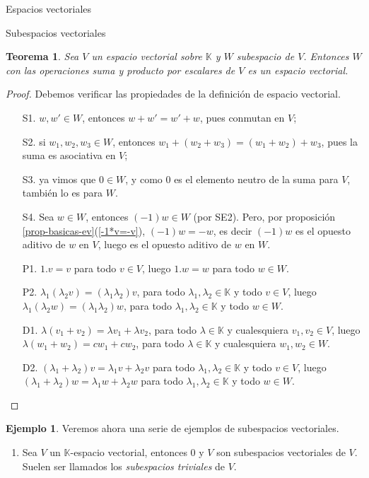 \documentclass[a4paper,12pt,twoside,spanish]{amsbook}
\newtheorem{teorema}{Teorema}[section]
\theoremstyle{definition}
\newtheorem{ejemplo}{Ejemplo}[section]
\theoremstyle{remark}
\newcommand{\K}{\mathbb K}
\begin{document}
\begin{chapter}{Espacios vectoriales}
\begin{section}{Subespacios vectoriales}
	\begin{teorema}
		Sea $V$ un espacio vectorial sobre $\K$ y $W$ subespacio de $V$. Entonces $W$ con las operaciones suma y producto por escalares de $V$ es un espacio vectorial.
	\end{teorema}
	\begin{proof} Debemos verificar las propiedades de la definición de espacio vectorial.
		\begin{enumerate}
			\item[S1.] $w,w' \in W$, entonces $w + w' = w' + w$, pues conmutan en $V$;
			\item[S2.] si $w_1,w_2,w_3 \in W$, entonces $w_1+(w_2+w_3) = (w_1+w_2)+w_3$, pues la suma es asociativa en $V$;
			\item[S3.] ya vimos que $0 \in W$, y como $0$ es el elemento neutro de la suma para $V$, también lo es para $W$.
			\item[S4.] Sea $w \in W$, entonces $(-1)w \in W$ (por SE2). Pero, por proposición \ref{prop-basicas-ev}(\ref{-1*v=-v}), $(-1)w=-w$,  es decir $(-1)w$ es el opuesto aditivo de $w$  en $V$, luego es el opuesto aditivo de $w$ en $W$.
			\item[P1.] $1.v=v$ para todo $v \in V$, luego $1.w =w$ para todo $w \in W$.
			\item[P2.] $\lambda_1(\lambda_2v) = (\lambda_1\lambda_2)v$, para todo $\lambda_1,\lambda_2 \in \K$ y todo $v \in V$, luego $\lambda_1(\lambda_2w) = (\lambda_1\lambda_2)w$, para todo $\lambda_1,\lambda_2 \in \K$ y todo $w \in W$.
			\item[D1.] $\lambda(v_1+v_2) = \lambda v_1 +\lambda v_2$, para todo $\lambda \in \K$ y cualesquiera $v_1,v_2 \in V$, luego   $\lambda(w_1+w_2) = cw_1 +cw_2$, para todo $\lambda \in \K$ y cualesquiera $w_1,w_2 \in W$.
			\item[D2.] $(\lambda_1+\lambda_2)v = \lambda_1v + \lambda_2 v$ para todo $\lambda_1,\lambda_2 \in \K$ y todo $v \in V$, luego $(\lambda_1+\lambda_2)w = \lambda_1w + \lambda_2 w$ para todo $\lambda_1,\lambda_2 \in \K$ y todo $w \in W$.
		\end{enumerate} 
	\end{proof}



\begin{ejemplo} Veremos ahora una serie de ejemplos de subespacios vectoriales.
	\begin{enumerate}
		\item Sea $V$ un $\K$-espacio vectorial, entonces $0$ y $V$ son subespacios vectoriales de $V$. Suelen ser llamados los \textit{subespacios triviales} de $V$.
		

\end{enumerate}
\end{ejemplo}
\end{section}
\end{chapter}
\end{document}
